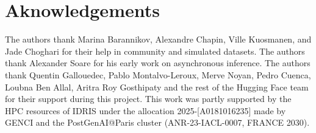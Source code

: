 \section{Aknowledgements}
The authors thank Marina Barannikov, Alexandre Chapin, Ville Kuosmanen, and Jade Choghari for their help in community and simulated datasets. 
The authors thank Alexander Soare for his early work on asynchronous inference.
The authors thank Quentin Gallouedec, Pablo Montalvo-Leroux, Merve Noyan, Pedro Cuenca, Loubna Ben Allal,  Aritra Roy Gosthipaty and the rest of the Hugging Face team for their support during this project. 
This work was partly supported by the HPC resources of IDRIS under the allocation 2025-[A0181016235] made by GENCI and the PostGenAI@Paris cluster (ANR-23-IACL-0007, FRANCE 2030).



